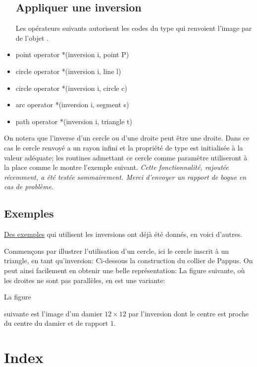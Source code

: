\documentclass[pdftex]{article}
\begin{document}
\begin{itemize}
  \subsection{Appliquer une inversion}
  Les opérateurs suivants autorisent les codes du type
   qui renvoient l'image par  de
  l'objet .
\item {}
  \begin{Vcolor}
    point operator *(inversion i, point P)
  \end{Vcolor}
\item {}
  \begin{Vcolor}
    circle operator *(inversion i, line l)
  \end{Vcolor}
\item {}
  \begin{Vcolor}
    circle operator *(inversion i, circle c)
  \end{Vcolor}
\item {}
  \begin{Vcolor}
    arc operator *(inversion i, segment s)
  \end{Vcolor}
\item {}
  \begin{Vcolor}
    path operator *(inversion i, triangle t)
  \end{Vcolor}
\end{itemize}

On notera que l'inverse d'un cercle ou d'une droite peut être une
droite. Dans ce cas le cercle  renvoyé a un rayon infini et
la propriété  de type  est initialisée à la
valeur adéquate; les routines admettant ce cercle comme paramètre
utiliseront  à la place comme le montre l'exemple
suivant.
\emph{Cette fonctionnalité, rajoutée récemment, a été testée
  sommairement. Merci d'envoyer un rapport de bogue en cas de
  problème.}
\subsection{Exemples}
\href{#exemple_inversion}{Des exemples} qui
utilisent les inversions ont déjà été donnés, en voici d'autres.

Commençons par illustrer l'utilisation d'un cercle, ici le cercle
inscrit à un triangle, en tant qu'inversion:
Ci-dessous la construction du collier de {\sc Pappus}.
On peut ainsi facilement en obtenir une belle représentation:
La figure suivante, où les droites ne sont pas parallèles, en est
une variante:

\hypertarget{inversion_damier}{La figure} suivante est l'image d'un
damier $12\times{}12$ par l'inversion dont le centre est proche \og{}du
centre du damier\fg{} et de rapport $1$.
\newpage
\section{Index}
\printindex
\end{document}

